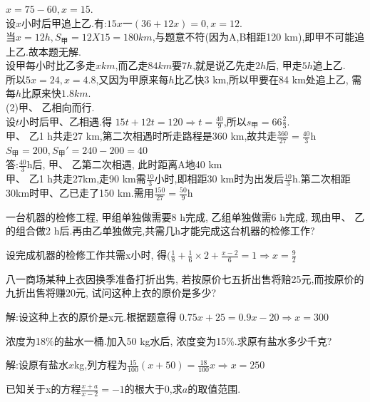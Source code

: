 \documentclass[cn,blue,12pt]{elegantbook}
\begin{document}
\begin{liti}[resume]
\begin{solution}
         \(x=75 - 60, x=15.\)\\
          设\(x\)小时后甲追上乙.有:\(15x一(36+12x)=0 , x=12\).\\
     当\(x=12h,S_\text{甲} =12X15=180 km\),与题意不符(因为A,B相距120 km),即甲不可能追上乙.故本题无解.\\
      设甲每小时比乙多走\(x km\),而乙走\(84 km\)要\(7h\),就是说乙先走\(2h\)后, 甲走\(5h\)追上乙.\\
     所以\(5x=24,x=4.8\),又因为甲原来每\(h\)比乙快3 km,所以甲要在84 km处追上乙, 需每\(h\)比原来快\(1.8 km\).\\
     (2)甲、 乙相向而行.\\
     设\(t\)小时后甲、乙相遇.得 \(15t+12t=120 \Rightarrow t=\frac{40}{9}\),所以\(s_\text{甲} =66\frac{2}{3}\).\\
     甲、 乙1 h共走27 km,第二次相遇时所走路程是360 km,故共走\(\frac{360}{27}=\frac{40}{3}\)h\\
     \(S_\text{甲}=200, S_\text{甲}'=240-200=40\)\\
     答:\(\frac{40}{3}\)h后, 甲、 乙第二次相遇, 此时距离A地40 km\\
      甲、 乙1 h共走27km,走90 km需\(\frac{10}{3}\)小时,即相距30 km时为出发后\(\frac{10}{3}\)h.第二次相距30km时甲、乙已走了150 km.需用\(\frac{150}{27}=\frac{50}{9}\)h
\end{solution}
\item  一台机器的检修工程, 甲组单独做需要8 h完成, 乙组单独做需6 h完成, 现由甲、 乙的组合做2 h后.再由乙单独做完,共需几h才能完成这台机器的检修工作?
\begin{solution}
        设完成机器的检修工作共需x小时, 得\((\frac{1}{8}+\frac{1}{6}\times 2+\frac{x-2}{6}=1 \Rightarrow x=\frac{9}{2}\)
\end{solution}
\item 八一商场某种上衣因换季准备打折出隽, 若按原价七五折出售将赔25元,而按原价的九折出售将赚20元, 试问这种上衣的原价是多少?
\begin{solution}
        解:设这种上衣的原价是x元.根据题意得 \(0.75x + 25=0.9x-20 \Rightarrow x=300\)
\end{solution}
\item 浓度为18\%的盐水一桶.加入50 kg水后, 浓度变为15\%.求原有盐水多少千克?
\begin{solution}
        解:设原有盐水\(x\)kg,列方程为\(\frac{15}{100}(x+50)=\frac{18}{100}x \Rightarrow x=250\)
\end{solution}
\item 已知关于x的方程\(\frac{x+a}{x-2}=-1\)的根大于0,求\(a\)的取值范围.

\end{liti}
\end{document}
